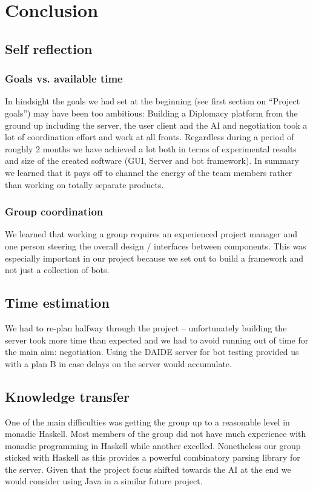 \documentclass[pdftex,12pt,a4paper]{report}
\begin{document}

\pagebreak

\chapter{Conclusion}

\section{Self reflection}

\subsection{Goals vs. available time}
In hindsight the goals we had set at the beginning (see first section
on ``Project goals'') may have been too ambitious: Building a
Diplomacy platform from the ground up including the server, the user
client and the AI and negotiation took a lot of coordination effort
and work at all fronts. Regardless during a period of roughly 2 months
we have achieved a lot both in terms of experimental results and size
of the created software (GUI, Server and bot framework). In summary we 
learned that it pays off to channel the energy of the team members 
rather than working on totally separate products.

\subsection{Group coordination} 
We learned that working a group requires an experienced project
manager and one person steering the overall design / interfaces
between components. This was especially important in our project 
because we set out to build a framework and not just a collection
of bots.

\section{Time estimation}
We had to re-plan halfway through the project -- unfortunately
building the server took more time than expected and
we had to avoid running out of time for the main aim: 
negotiation. Using the DAIDE server for bot testing provided
us with a plan B in case delays on the server would accumulate.

\section{Knowledge transfer}
One of the main difficulties was getting the group up to a reasonable
level in monadic Haskell. Most members of the group did not have much
experience with monadic programming in Haskell while another excelled.
Nonetheless our group sticked with Haskell as this provides a 
powerful combinatory parsing library \cite{ParsecLib} for the server.
Given that the project focus shifted towards the AI at the end we 
would consider using Java in a similar future project.
\end{document}

